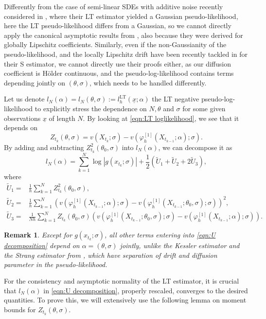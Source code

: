 \documentclass[a4paper,12pt]{article}
\numberwithin{equation}{section}
\theoremstyle{plain}
\newtheorem{remark}{Remark}
\theoremstyle{definition}
\begin{document}
Differently from the case of semi-linear SDEs with additive noise recently considered in \cite{pilipovic_parameter_2024}, where their LT estimator yielded a Gaussian pseudo-likelihood, here the LT pseudo-likelihood differs from a Gaussian, so we cannot directly apply the canonical asymptotic results from \cite{kessler_estimation_1997}, also because they were derived for globally Lipschitz coefficients. Similarly, even if the non-Gaussianity of the pseudo-likelihood, and the locally Lipschitz drift have been recently tackled in \cite{pilipovic_parameter_2024} for their S estimator, we cannot directly use their proofs either, as our diffusion coefficient is H\"older continuous, and the pseudo-log-likelihood contains terms depending jointly on $(\theta,\sigma)$, which needs to be handled differently.

Let us denote  $l_N(\alpha)=l_N(\theta,\sigma):=l^{\textrm{LT}}_h(\underline{x};\alpha)$
the LT negative pseudo-log-likelihood to explicitly stress the dependence on $N, \theta$ and $\sigma$ for some given observations $\underline{x}$ of length $N$. By looking at \eqref{eqn:LT loglikelihood}, we see that it depends on
\begin{equation}\label{Z}
Z_{t_k}(\theta,\sigma)=v(X_{t_k};\sigma)-v(\varphi^{[1]}_h(X_{t_{k-1}};\alpha);\sigma).
\end{equation}
By adding and subtracting $Z_{t_k}^2(\theta_0,\sigma)$ into $l_N(\alpha)$, we can decompose it as  \begin{equation}\label{eqn:U decomposition}
l_N(\alpha)=\sum_{k=1}^{N}\log |g(x_{t_k};\sigma)|+\frac{1}{2}\left(\tilde U_1+\tilde U_2+2\tilde U_3\right),
    \end{equation}
    where 
    \begin{align*}
        \tilde U_1=&\frac{1}{h} \sum_{k=1}^N Z_{t_k}^2\left(\theta_0,\sigma\right)
        ,\\
        \tilde U_2=&\frac{1}{h} \sum_{k=1}^N \left(v\left(\varphi^{[1]}_h(X_{t_{k-1}};\alpha) ; \sigma \right)-v\left(\varphi^{[1]}_h(X_{t_{k-1}};\theta_0,\sigma) ; \sigma \right)\right)^2        ,\\
        \tilde U_3=&\frac{1}{N h} \sum_{k=1}^NZ_{t_k}(\theta_0,\sigma)\left(v\left(\varphi^{[1]}_h(X_{t_{k-1}};\theta_0,\sigma) ; \sigma\right)-v\left(\varphi^{[1]}_h(X_{t_{k-1}};\alpha) ; \sigma \right)\right).
    \end{align*}
\begin{remark}\label{RemarkZ}
Except for $g(x_{t_k};\sigma)$, all other terms entering into \eqref{eqn:U decomposition} depend on $\alpha=(\theta,\sigma)$ jointly, unlike the Kessler estimator and the Strang estimator from \cite{pilipovic_parameter_2024}, which have separation of drift and diffusion parameter in the pseudo-likelihood.
\end{remark}
For the consistency and asymptotic normality of the LT estimator, it is crucial that $l_N(\alpha)$ in \eqref{eqn:U decomposition}, properly rescaled, converges to the desired quantities. To prove this, we will extensively use the following lemma on moment bounds for $Z_{t_k}(\theta,\sigma)$. 
 
\end{document}

